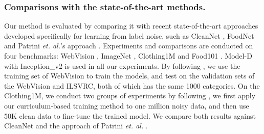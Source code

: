 \documentclass[runningheads]{llncs}
\begin{document}
\begin{table*} [tp]
\begin{floatrow}
\end{floatrow}
\end{table*}














\subsubsection{Comparisons with the state-of-the-art methods.}
Our method is evaluated by comparing it with recent state-of-the-art approaches developed specifically for learning from label noise, such as CleanNet \cite{Lee2017}, FoodNet \cite{pandey2017foodnet} and Patrini \emph{et. al.}'s approach \cite{Patrini2017}. Experiments and comparisons are conducted on four benchmarks: WebVision \cite{li2017webvisiondata}, ImageNet \cite{DengDSLL009}, Clothing1M \cite{xiao2015learning} and Food101 \cite{bossard2014food}.  Model-D with Inception\_v2 is used in all our experiments. By following \cite{Lee2017}, we use the training set of WebVision to train the models, and test on the validation sets of the WebVision and ILSVRC, both of which has the same 1000 categories. On the Clothing1M, we conduct two groups of experiments by following \cite{Lee2017}, we first apply our curriculum-based training method to one million noisy data, and then use 50K clean data to fine-tune the trained model. We compare both results against CleanNet \cite{Lee2017} and the approach of Patrini \emph{et. al.} \cite{Patrini2017}.
\end{document}
